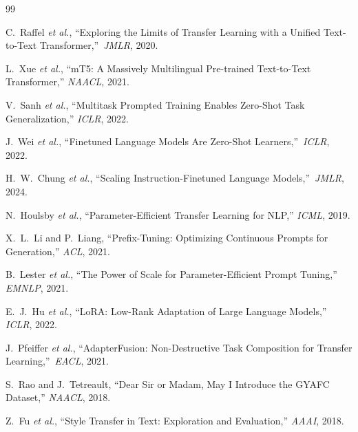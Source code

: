 \documentclass[12pt,a4paper]{ctexart}
\begin{document}
\begin{thebibliography}{99}

C.~Raffel \emph{et al.}, ``Exploring the Limits of Transfer Learning with a Unified Text-to-Text Transformer,''\ \emph{JMLR}, 2020.



L.~Xue \emph{et al.}, ``mT5: A Massively Multilingual Pre-trained Text-to-Text Transformer,'' \emph{NAACL}, 2021.



V.~Sanh \emph{et al.}, ``Multitask Prompted Training Enables Zero-Shot Task Generalization,'' \emph{ICLR}, 2022.



J.~Wei \emph{et al.}, ``Finetuned Language Models Are Zero-Shot Learners,''\ \emph{ICLR}, 2022.



H.~W.~Chung \emph{et al.}, ``Scaling Instruction-Finetuned Language Models,''\ \emph{JMLR}, 2024.



N.~Houlsby \emph{et al.}, ``Parameter-Efficient Transfer Learning for NLP,'' \emph{ICML}, 2019.



X.~L.~Li and P.~Liang, ``Prefix-Tuning: Optimizing Continuous Prompts for Generation,'' \emph{ACL}, 2021.



B.~Lester \emph{et al.}, ``The Power of Scale for Parameter-Efficient Prompt Tuning,'' \emph{EMNLP}, 2021.



E.~J.~Hu \emph{et al.}, ``LoRA: Low-Rank Adaptation of Large Language Models,'' \emph{ICLR}, 2022.



J.~Pfeiffer \emph{et al.}, ``AdapterFusion: Non-Destructive Task Composition for Transfer Learning,''\ \emph{EACL}, 2021.



S.~Rao and J.~Tetreault, ``Dear Sir or Madam, May I Introduce the GYAFC Dataset,'' \emph{NAACL}, 2018.



Z.~Fu \emph{et al.}, ``Style Transfer in Text: Exploration and Evaluation,'' \emph{AAAI}, 2018.




\end{thebibliography}
\end{document}
